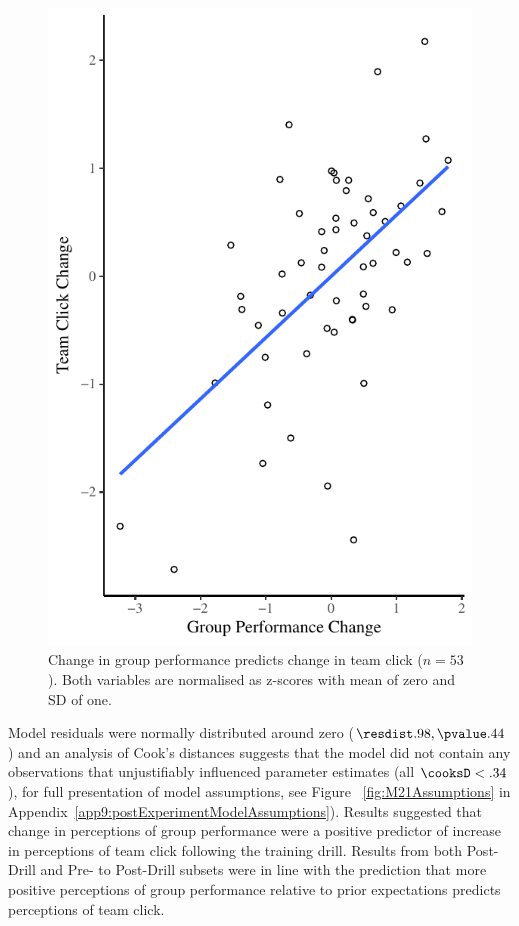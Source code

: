 
 \begin{figure}
     \centering
     \includegraphics[width=0.5\linewidth,keepaspectratio] {images/groupPerfClickChangeCondition}
     \caption{Change in group performance predicts change in team click ($n = 53$).  Both variables are normalised as z-scores with mean of zero and SD of one.}
     \label{fig:groupPerfClickChangeCondition}
 \end{figure}

Model residuals were normally distributed around zero ($\resdist .98, \pvalue .44$) and an analysis of Cook's distances suggests that the model did not contain any observations that unjustifiably influenced parameter estimates (all $\cooksD < .34$), for full presentation of model assumptions, see Figure ~\ref{fig:M21Assumptions} in Appendix~\ref{app9:postExperimentModelAssumptions}). Results suggested that change in perceptions of group performance were a positive predictor of increase in perceptions of team click following the training drill.  Results from both Post-Drill and Pre- to Post-Drill subsets were in line with the prediction that more positive perceptions of group performance relative to prior expectations predicts perceptions of team click.



